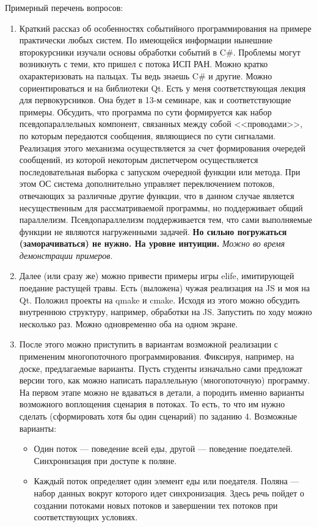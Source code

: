 Примерный перечень вопросов:
\begin{enumerate}
    \item Краткий рассказ об особенностях событийного программирования на примере практически любых систем. По имеющейся информации нынешние второкурсники изучали основы обработки событий в C\#. Проблемы могут возникнуть с теми, кто пришел с потока ИСП РАН. Можно кратко охарактеризовать на пальцах. Ты ведь знаешь C\# и другие. Можно сориентироваться и на библиотеки Qt. Есть у меня соответствующая лекция для первокурсников. Она будет в 13-м семинаре, как и соответствующие примеры. Обсудить, что программа по сути формируется как набор псевдопараллельных компонент, связанных между собой <<проводами>>, по которым передаются сообщения, являющиеся по сути сигналами. Реализация этого механизма осуществляется за счет формирования очередей сообщений, из которой некоторым диспетчером осуществляется последовательная выборка с запуском очередной функции или метода. При этом ОС система дополнительно управляет переключением потоков, отвечающих за различные другие функции, что в данном случае является несущественным для рассматриваемой программы, но поддерживает общий параллелизм. Псевдопараллелизм поддерживается тем, что сами выполняемые функции не являются нагруженными задачей. \textbf{Но сильно погружаться (заморачиваться) не нужно. На уровне интуиции.} \textit{Можно во время демонстрации примеров.}
    \item Далее (или сразу же) можно привести примеры игры elife, имитирующей поедание растущей травы. Есть (выложена) чужая реализация на JS и моя на Qt. Положил проекты на qmake и cmake. Исходя из этого можно обсудить внутреннюю структуру, например, обработки на JS. Запустить по ходу можно несколько раз. Можно одновременно оба на одном экране.
    \item После этого можно приступить в вариантам возможной реализации с примененим многопоточного программирования. Фиксируя, например, на доске, предлагаемые варианты. Пусть студенты изначально сами предложат версии того, как можно написать параллельную (многопоточную) программу. На первом этапе можно не вдаваться в детали, а породить именно варианты возможного воплощения сценария в потоках. То есть, то что им нужно сделать (сформировать хотя бы один сценарий) по заданию 4. Возможные варианты:
        \begin{itemize}
            \item Один поток --- поведение всей еды, другой --- поведение поедателей. Синхронизация при доступе к поляне.
            \item Каждый поток определяет один элемент еды или поедателя. Поляна --- набор данных вокруг которого идет синхронизация. Здесь речь пойдет о создании потоками новых потоков и завершении тех потоков при соответствующих условиях.

\end{itemize}
\end{enumerate}
